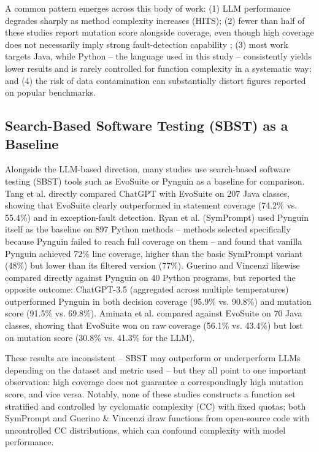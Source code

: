 \documentclass[conference]{IEEEtran}
\begin{document}
A common pattern emerges across this body of work: (1) LLM performance degrades sharply as method complexity increases (HITS); (2) fewer than half of these studies report mutation score alongside coverage, even though high coverage does not necessarily imply strong fault-detection capability \cite{b12}; (3) most work targets Java, while Python -- the language used in this study -- consistently yields lower results and is rarely controlled for function complexity in a systematic way; and (4) the risk of data contamination can substantially distort figures reported on popular benchmarks.
\subsection{Search-Based Software Testing (SBST) as a Baseline}
\label{subsec:related-sbst}
Alongside the LLM-based direction, many studies use search-based software testing (SBST) tools such as EvoSuite or Pynguin as a baseline for comparison. Tang et al. \cite{b17} directly compared ChatGPT with EvoSuite on 207 Java classes, showing that EvoSuite clearly outperformed in statement coverage (74.2\% vs. 55.4\%) and in exception-fault detection. Ryan et al. \cite{b18} (SymPrompt) used Pynguin itself as the baseline on 897 Python methods -- methods selected specifically because Pynguin failed to reach full coverage on them -- and found that vanilla Pynguin achieved 72\% line coverage, higher than the basic SymPrompt variant (48\%) but lower than its filtered version (77\%). Guerino and Vincenzi \cite{b19} likewise compared directly against Pynguin on 40 Python programs, but reported the opposite outcome: ChatGPT-3.5 (aggregated across multiple temperatures) outperformed Pynguin in both decision coverage (95.9\% vs. 90.8\%) and mutation score (91.5\% vs. 69.8\%). Aminata et al. \cite{b20} compared against EvoSuite on 70 Java classes, showing that EvoSuite won on raw coverage (56.1\% vs. 43.4\%) but lost on mutation score (30.8\% vs. 41.3\% for the LLM).

These results are inconsistent -- SBST may outperform or underperform LLMs depending on the dataset and metric used -- but they all point to one important observation: high coverage does not guarantee a correspondingly high mutation score, and vice versa. Notably, none of these studies constructs a function set stratified and controlled by cyclomatic complexity (CC) with fixed quotas; both SymPrompt and Guerino \& Vincenzi draw functions from open-source code with uncontrolled CC distributions, which can confound complexity with model performance.
\end{document}
